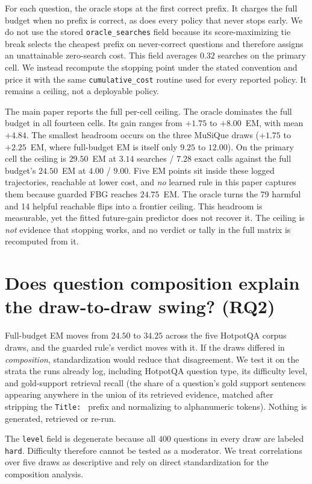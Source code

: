 \documentclass[manuscript,nonacm]{acmart}
\begin{document}
For each question, the oracle stops at the first correct prefix. It charges the
full budget when no prefix is correct, as does every policy that never stops
early. We do not use the stored \texttt{oracle\_searches} field because
its score-maximizing tie break selects the cheapest prefix on never-correct
questions and therefore assigns an unattainable zero-search cost. This field
averages $0.32$ searches on the primary cell. We instead recompute the stopping
point under the stated convention and price it with the same
\texttt{cumulative\_cost} routine used for every reported policy.
It remains a ceiling, not a deployable policy.

The main paper reports the full per-cell ceiling. The oracle dominates the
full budget in all fourteen cells. Its gain ranges
from $+1.75$ to $+8.00$~EM, with mean $+4.84$. The smallest
headroom occurs on the three MuSiQue draws ($+1.75$ to $+2.25$~EM, where full-budget
EM is itself only $9.25$ to $12.00$). On the primary cell the ceiling is
$29.50$~EM at $3.14$ searches / $7.28$ exact calls against the full budget's
$24.50$~EM at $4.00$ / $9.00$. Five EM points sit inside these logged
trajectories, reachable at lower cost, and \emph{no} learned rule in this
paper captures them because guarded FBG reaches $24.75$~EM. The oracle turns
the 79 harmful and 14 helpful reachable flips into a frontier ceiling. This
headroom is measurable, yet the fitted future-gain predictor does not recover
it. The ceiling is \emph{not} evidence that stopping works, and no verdict or
tally in the full matrix is recomputed from it.

\FloatBarrier
\section{Does question composition explain the draw-to-draw swing? (RQ2)}
\label{supp:strata}

Full-budget EM moves from $24.50$ to $34.25$ across the five HotpotQA
corpus draws, and the guarded rule's verdict moves with it. If the draws
differed in \emph{composition}, standardization would reduce that disagreement. We test
it on the strata the runs already log, including HotpotQA question type, its
difficulty level, and gold-support retrieval recall (the share of a question's
gold support sentences appearing anywhere in the union of its retrieved
evidence, matched after stripping the \texttt{Title: } prefix and normalizing
to alphanumeric tokens). Nothing is generated, retrieved or re-run.

The \texttt{level} field is degenerate because all $400$ questions in every
draw are labeled \texttt{hard}. Difficulty therefore cannot be tested as a moderator.
We treat correlations over five draws as descriptive and rely on direct
standardization for the composition analysis.
\end{document}
